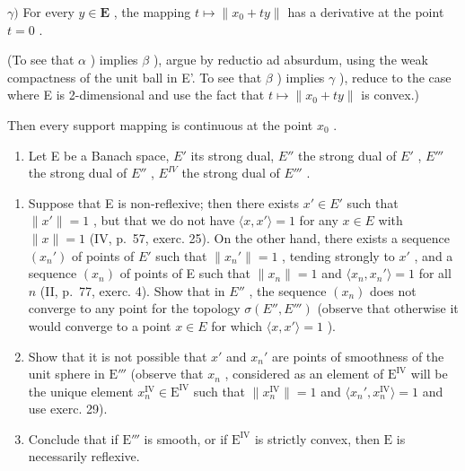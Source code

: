 \(\gamma)\) For every \(y \in \mathbf{E}\) , the mapping \(t \mapsto \| x_0 + ty\|\) has a derivative at the point \(t = 0\) .

(To see that \(\alpha\) ) implies \(\beta\) ), argue by reductio ad absurdum, using the weak compactness of the unit ball in E'. To see that \(\beta\) ) implies \(\gamma\) ), reduce to the case where E is 2-dimensional and use the fact that \(t \mapsto \|x_0 + ty\|\) is convex.)

Then every support mapping is continuous at the point \(x_0\) .

\begin{enumerate}
\def\labelenumi{\arabic{enumi})}
\setcounter{enumi}{29}
\tightlist
\item
  Let E be a Banach space, \(E'\) its strong dual, \(E''\) the strong dual of \(E'\) , \(E'''\) the strong dual of \(E''\) , \(E^{IV}\) the strong dual of \(E'''\) .
\end{enumerate}

\begin{enumerate}
\def\labelenumi{\alph{enumi})}
\item
  Suppose that E is non-reflexive; then there exists \(x' \in E'\) such that \(\| x' \| = 1\) , but that we do not have \(\langle x, x' \rangle = 1\) for any \(x \in E\) with \(\| x \| = 1\) (IV, p.~57, exerc. 25). On the other hand, there exists a sequence \((x_n')\) of points of \(E'\) such that \(\| x_n' \| = 1\) , tending strongly to \(x'\) , and a sequence \((x_n)\) of points of E such that \(\| x_n \| = 1\) and \(\langle x_n, x_n' \rangle = 1\) for all \(n\) (II, p.~77, exerc. 4). Show that in \(E''\) , the sequence \((x_n)\) does not converge to any point for the topology \(\sigma(E'', E''')\) (observe that otherwise it would converge to a point \(x \in E\) for which \(\langle x, x' \rangle = 1\) ).
\item
  Show that it is not possible that \(x'\) and \(x_n'\) are points of smoothness of the unit sphere in \(\mathrm{E}'''\) (observe that \(x_n\) , considered as an element of \(\mathrm{E}^{\mathrm{IV}}\) will be the unique element \(x_n^{\mathrm{IV}} \in \mathrm{E}^{\mathrm{IV}}\) such that \(\| x_n^{\mathrm{IV}} \| = 1\) and \(\langle x_n', x_n^{\mathrm{IV}} \rangle = 1\) and use exerc. 29).
\item
  Conclude that if \(\mathrm{E}'''\) is smooth, or if \(\mathrm{E}^{\mathrm{IV}}\) is strictly convex, then \(\mathrm{E}\) is necessarily reflexive.
\end{enumerate}

